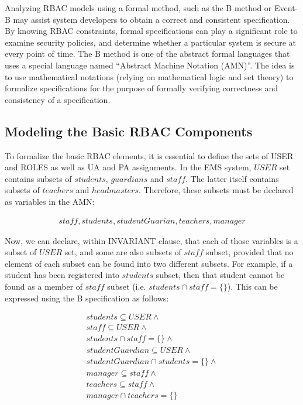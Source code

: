      Analyzing RBAC models using a formal method, such as the B method or Event-B may assist system developers to obtain a correct and consistent specification.  By knowing RBAC constraints, formal specifications can play a significant role to examine security policies, and determine whether a particular system is secure at every point of time.
The B method is one of the abstract formal languages that uses a special language named “Abstract Machine Notation (AMN)”.  The idea is to use mathematical notations (relying on mathematical logic and set theory) to formalize specifications for the purpose of formally verifying correctness and consistency of a specification.

\subsection{Modeling the Basic RBAC Components}

To formalize the basic RBAC elements, it is essential to define the sets of USER and ROLES as well as UA and PA assignments.  In the EMS system, $USER$ set contains subsets of $students$, $guardians$ and $staff$.  The latter itself contains subsets of $teachers$ and $headmasters$.  Therefore, these subsets must be declared as variables in the AMN: 

\begin{align*}
staff, students, studentGuarian, teachers, manager
\end{align*}


Now, we can declare, within INVARIANT clause, that each of those variables is a subset of $USER$ set, and some are also subsets of $staff$ subset, provided that no element of each subset can be found into two different subsets.  For example, if a student has been registered into $students$ subset, then that student cannot be found as a member of $staff$ subset (i.e. $ students \cap staff = \{\}$).  This can be expressed using the B specification as follows:


\begin{align*}
students \subseteq USER  \wedge \\
staff \subseteq USER  \wedge \\
students \cap staff = \{ \}  \wedge \\
studentGuardian \subseteq USER   \wedge \\
studentGuardian\cap students = \{ \}  \wedge \\
manager \subseteq staff   \wedge \\
teachers \subseteq staff   \wedge \\
manager \cap teachers = \{ \} \\ 
\end{align*}




